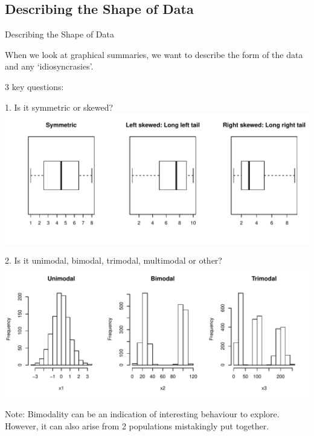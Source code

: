 \documentclass[t,xcolor=pdftex,dvipsnames,table]{beamer}
\makeatletter
\def\maxwidth{ %
  \ifdim\Gin@nat@width>\linewidth
    \linewidth
  \else
    \Gin@nat@width
  \fi
}
\newenvironment{knitrout}{}{} %
\makeatother
\begin{document}
\subsection[]{Describing the Shape of Data}
\begin{frame}[fragile]{Describing the Shape of Data}

When we look at graphical summaries, we want to describe the form of the data and any ‘idiosyncrasies’.

\vspace{.5cm}
3 key questions:

1. Is it symmetric or skewed?
\begin{knitrout}
\color{fgcolor}
\includegraphics[width=\maxwidth]{figure/unnamed-chunk-17-1} 

\end{knitrout}
\end{frame}

\begin{frame}[fragile]{}

2. Is it unimodal, bimodal, trimodal, multimodal or other?
\begin{knitrout}
\color{fgcolor}
\includegraphics[width=\maxwidth]{figure/unnamed-chunk-18-1} 

\end{knitrout}

Note: Bimodality can be an indication of interesting behaviour to explore. However, it can also arise from 2 populations mistakingly put together. 
\end{frame}
\end{document}
